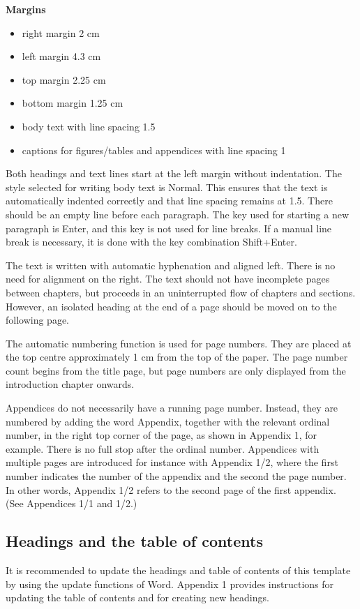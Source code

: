 \documentclass[12pt]{article}
\begin{document}
\textbf{Margins}

\begin{itemize}
	\item{right margin 2 cm}
	\item{left margin 4.3 cm}
	\item{top margin 2.25 cm}
	\item{bottom margin 1.25 cm}
	\item{body text with line spacing 1.5}
	\item{captions for figures/tables and appendices with line spacing 1}
\end{itemize}

Both headings and text lines start at the left margin without indentation. The style selected for writing body text is Normal. This ensures that the text is automatically indented correctly and that line spacing remains at 1.5. There should be an empty line before each paragraph. The key used for starting a new paragraph is Enter, and this key is not used for line breaks. If a manual line break is necessary, it is done with the key combination Shift+Enter.

The text is written with automatic hyphenation and aligned left. There is no need for alignment on the right. The text should not have incomplete pages between chapters, but proceeds in an uninterrupted flow of chapters and sections. However, an isolated heading at the end of a page should be moved on to the following page.

The automatic numbering function is used for page numbers. They are placed at the top centre approximately 1 cm from the top of the paper. The page number count begins from the title page, but page numbers are only displayed from the introduction chapter onwards.

Appendices do not necessarily have a running page number. Instead, they are numbered by adding the word Appendix, together with the relevant ordinal number, in the right top corner of the page, as shown in Appendix 1, for example. There is no full stop after the ordinal number. Appendices with multiple pages are introduced for instance with Appendix 1/2, where the first number indicates the number of the appendix and the second the page number. In other words, Appendix 1/2 refers to the second page of the first appendix. (See Appendices 1/1 and 1/2.)

\subsection{Headings and the table of contents}
It is recommended to update the headings and table of contents of this template by using the update functions of Word. Appendix 1 provides instructions for updating the table of contents and for creating new headings.
\end{document}
